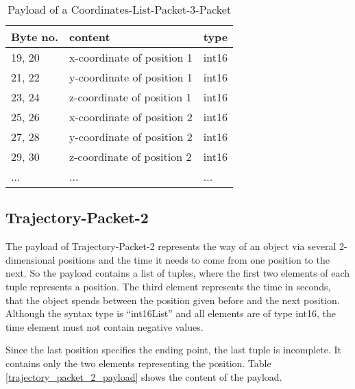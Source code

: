 \begin{table}[htdp]
  \begin{center}
    \begin{tabular}{l|l|l}
      \textbf{Byte no.} & \textbf{content} & \textbf{type} \\
      \hline
      \hline
      19, 20 & x-coordinate of position 1 & int16 \\
      \hline
      21, 22 & y-coordinate of position 1 & int16 \\
      \hline
      23, 24 & z-coordinate of position 1 & int16 \\
      \hline
      25, 26 & x-coordinate of position 2 & int16 \\
      \hline
      27, 28 & y-coordinate of position 2 & int16 \\
      \hline
      29, 30 & z-coordinate of position 2 & int16 \\
      \hline
      ... & ... & ... \\
    \end{tabular}
  \end{center}
  \caption{Payload of a Coordinates-List-Packet-3-Packet}
  \label{coordinates_list_packet_3_payload}
\end{table}

\subsection{Trajectory-Packet-2}
\label{subsection:trajectory2d}

The payload of Trajectory-Packet-2 represents the way of an object via several 2-dimensional positions and the time it needs
to come from one position to the next. So the payload contains a list of tuples, where the first two elements of each tuple
represents a position. The third element represents the time in seconds, that the object spends between the position given
before and the next position. Although the syntax type is ``int16List'' and all elements are of type int16, the time
element must not contain negative values.

Since the last position specifies the ending point, the last tuple is incomplete. It contains only the two elements
representing the position. Table \ref{trajectory_packet_2_payload} shows the content of the payload.


